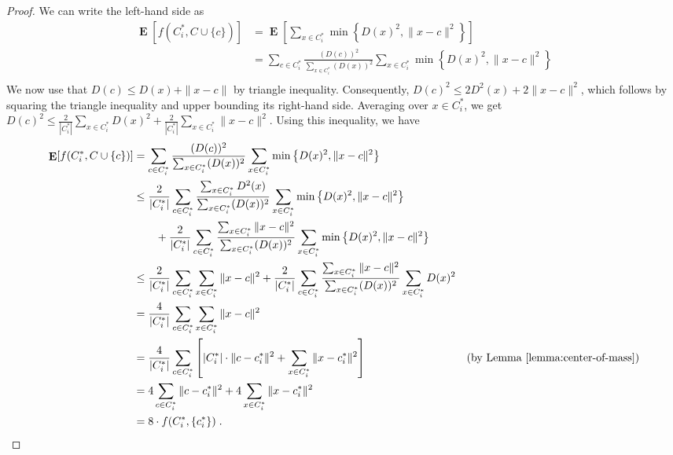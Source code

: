 \documentclass{article}
\newcommand{\norm}[1]{\|{#1}\|}
\DeclareMathOperator*{\Exp}{\mathbf{E}}
\begin{document}
\begin{proof}
We can write the left-hand side as
\begin{align*}
\Exp[f(C_i^*, C \cup \{c\})]
& = \Exp\left[ \sum_{x \in C_i^*} \min\left\{D(x)^2, \norm{x-c}^2 \right\} \right] \\
& = \sum_{c \in C^*_i} \frac{(D(c))^2}{\sum_{x \in C_i^*} (D(x))^2} \sum_{x \in C_i^*} \min\left\{D(x)^2, \norm{x - c}^2\right\} \\
\end{align*}
We now use that $D(c) \le D(x) + \norm{x - c}$ by triangle inequality.
Consequently, $D(c)^2 \le 2 D^2(x) + 2 \norm{x - c}^2$, which follows by
squaring the triangle inequality and upper bounding its right-hand side.
Averaging over $x \in C_i^*$, we get $D(c)^2 \le \frac{2}{|C_i^*|} \sum_{x \in
C_i^*} D(x)^2 + \frac{2}{|C_i^*|} \sum_{x \in C_i^*} \norm{x - c}^2$. Using this
inequality, we have
\begin{align*}
\Exp[f(C_i^*, C \cup \{c\})]
& = \sum_{c \in C^*_i} \frac{(D(c))^2}{\sum_{x \in C_i^*} (D(x))^2} \sum_{x \in C_i^*} \min\left\{D(x)^2, \norm{x - c}^2\right\} \\
& \le \frac{2}{|C^*_i|} \sum_{c \in C^*_i} \frac{\sum_{x \in C_i^*} D^2(x)}{\sum_{x \in C_i^*} (D(x))^2} \sum_{x \in C_i^*} \min\left\{D(x)^2, \norm{x - c}^2\right\} \\
& \qquad + \frac{2}{|C^*_i|} \sum_{c \in C^*_i} \frac{\sum_{x \in C_i^*} \norm{x-c}^2}{\sum_{x \in C_i^*} (D(x))^2} \sum_{x \in C_i^*} \min\left\{D(x)^2, \norm{x - c}^2\right\} \\
& \le \frac{2}{|C^*_i|} \sum_{c \in C^*_i} \sum_{x \in C_i^*} \norm{x - c}^2 + \frac{2}{|C_i^*|} \sum_{c \in C^*_i} \frac{\sum_{x \in C_i^*} \norm{x-c}^2}{\sum_{x \in C_i^*} (D(x))^2} \sum_{x \in C_i^*} D(x)^2 \\
& = \frac{4}{|C^*_i|} \sum_{c \in C^*_i} \sum_{x \in C_i^*} \norm{x - c}^2 \\
& = \frac{4}{|C^*_i|} \sum_{c \in C^*_i} \left[ |C^*_i| \cdot \norm{c - c^*_i}^2 + \sum_{x \in C_i^*} \norm{x - c_i^*}^2 \right] & \text{(by Lemma~\ref{lemma:center-of-mass})} \\
& = 4 \sum_{c \in C^*_i} \norm{c - c^*_i}^2 + 4 \sum_{x \in C_i^*} \norm{x - c_i^*}^2 \\
& = 8 \cdot f(C^*_i, \{c^*_i\}) \; .
\end{align*}
\end{proof}
\end{document}
